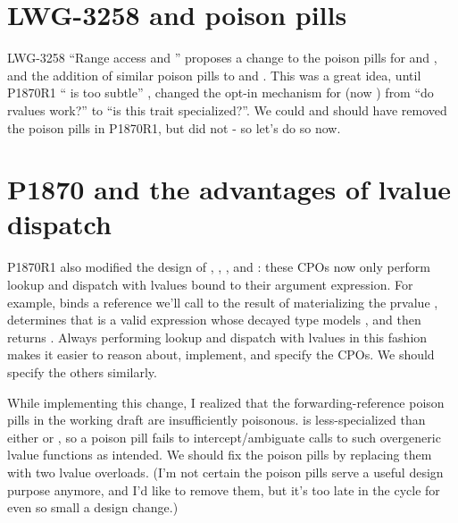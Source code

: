 \section{LWG-3258 and poison pills}

LWG-3258 ``Range access and '' \cite{lwg3258}
proposes a change to the  poison pills
for  and , and
the addition of similar poison pills to  and .
This was a great idea, until
P1870R1 `` is too subtle'' \cite{p1870r1},
changed the opt-in mechanism for 
(now ) from ``do rvalues work?''
to ``is this trait specialized?''.
We could and should have removed the  poison pills
in P1870R1, but did not - so let's do so now.


\section{P1870 and the advantages of lvalue dispatch}

P1870R1 also modified the design of
, , , and :
these CPOs now only perform lookup and dispatch
with lvalues bound to their argument expression.
For example,  binds
a reference we'll call  to the result of materializing
the prvalue ,
determines that  is a valid expression
whose decayed type models ,
and then returns .
Always performing lookup and dispatch with lvalues in this fashion
makes it easier to reason about, implement, and specify the CPOs.
We should specify the others similarly.

While implementing this change,
I realized that the forwarding-reference poison pills in the working draft
are insufficiently poisonous.
 is less-specialized than either
 or ,
so a  poison pill fails to intercept/ambiguate
calls to such overgeneric lvalue functions as intended.
We should fix the poison pills by replacing them with two lvalue overloads.
(I'm not certain the poison pills serve a useful design purpose anymore,
and I'd like to remove them,
but it's too late in the cycle for even so small a design change.)


